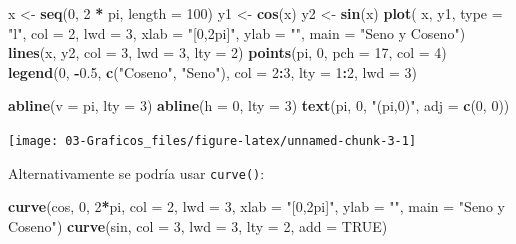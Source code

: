 \documentclass[]{book}
\newenvironment{Shaded}{\begin{snugshade}}{\end{snugshade}}
\newcommand{\KeywordTok}[1]{\textcolor[rgb]{0.13,0.29,0.53}{\textbf{#1}}}
\newcommand{\DataTypeTok}[1]{\textcolor[rgb]{0.13,0.29,0.53}{#1}}
\newcommand{\DecValTok}[1]{\textcolor[rgb]{0.00,0.00,0.81}{#1}}
\newcommand{\FloatTok}[1]{\textcolor[rgb]{0.00,0.00,0.81}{#1}}
\newcommand{\StringTok}[1]{\textcolor[rgb]{0.31,0.60,0.02}{#1}}
\newcommand{\OtherTok}[1]{\textcolor[rgb]{0.56,0.35,0.01}{#1}}
\newcommand{\OperatorTok}[1]{\textcolor[rgb]{0.81,0.36,0.00}{\textbf{#1}}}
\newcommand{\NormalTok}[1]{#1}
\begin{document}
\begin{Shaded}
\begin{Highlighting}[]
\NormalTok{x <-}\StringTok{ }\KeywordTok{seq}\NormalTok{(}\DecValTok{0}\NormalTok{, }\DecValTok{2} \OperatorTok{*}\StringTok{ }\NormalTok{pi, }\DataTypeTok{length =} \DecValTok{100}\NormalTok{)}
\NormalTok{y1 <-}\StringTok{ }\KeywordTok{cos}\NormalTok{(x)}
\NormalTok{y2 <-}\StringTok{ }\KeywordTok{sin}\NormalTok{(x)}
\KeywordTok{plot}\NormalTok{( x, y1, }\DataTypeTok{type =} \StringTok{"l"}\NormalTok{, }\DataTypeTok{col =} \DecValTok{2}\NormalTok{, }\DataTypeTok{lwd =} \DecValTok{3}\NormalTok{, }\DataTypeTok{xlab =} \StringTok{"[0,2pi]"}\NormalTok{, }\DataTypeTok{ylab =} \StringTok{""}\NormalTok{, }\DataTypeTok{main =} \StringTok{"Seno y Coseno"}\NormalTok{)}
\KeywordTok{lines}\NormalTok{(x, y2, }\DataTypeTok{col =} \DecValTok{3}\NormalTok{, }\DataTypeTok{lwd =} \DecValTok{3}\NormalTok{, }\DataTypeTok{lty =} \DecValTok{2}\NormalTok{)}
\KeywordTok{points}\NormalTok{(pi, }\DecValTok{0}\NormalTok{, }\DataTypeTok{pch =} \DecValTok{17}\NormalTok{, }\DataTypeTok{col =} \DecValTok{4}\NormalTok{)}
\KeywordTok{legend}\NormalTok{(}\DecValTok{0}\NormalTok{, }\OperatorTok{-}\FloatTok{0.5}\NormalTok{, }\KeywordTok{c}\NormalTok{(}\StringTok{"Coseno"}\NormalTok{, }\StringTok{"Seno"}\NormalTok{), }\DataTypeTok{col =} \DecValTok{2}\OperatorTok{:}\DecValTok{3}\NormalTok{, }\DataTypeTok{lty =} \DecValTok{1}\OperatorTok{:}\DecValTok{2}\NormalTok{, }\DataTypeTok{lwd =} \DecValTok{3}\NormalTok{)}

\KeywordTok{abline}\NormalTok{(}\DataTypeTok{v =}\NormalTok{ pi, }\DataTypeTok{lty =} \DecValTok{3}\NormalTok{)}
\KeywordTok{abline}\NormalTok{(}\DataTypeTok{h =} \DecValTok{0}\NormalTok{, }\DataTypeTok{lty =} \DecValTok{3}\NormalTok{)}
\KeywordTok{text}\NormalTok{(pi, }\DecValTok{0}\NormalTok{, }\StringTok{"(pi,0)"}\NormalTok{, }\DataTypeTok{adj =} \KeywordTok{c}\NormalTok{(}\DecValTok{0}\NormalTok{, }\DecValTok{0}\NormalTok{))}
\end{Highlighting}
\end{Shaded}

\begin{center}\texttt{[image: 03-Graficos\_files/figure-latex/unnamed-chunk-3-1]} \end{center}

Alternativamente se podría usar \texttt{curve()}:

\begin{Shaded}
\begin{Highlighting}[]
\KeywordTok{curve}\NormalTok{(cos, }\DecValTok{0}\NormalTok{, }\DecValTok{2}\OperatorTok{*}\NormalTok{pi, }\DataTypeTok{col =} \DecValTok{2}\NormalTok{, }\DataTypeTok{lwd =} \DecValTok{3}\NormalTok{, }
      \DataTypeTok{xlab =} \StringTok{"[0,2pi]"}\NormalTok{, }\DataTypeTok{ylab =} \StringTok{""}\NormalTok{, }\DataTypeTok{main =} \StringTok{"Seno y Coseno"}\NormalTok{)}
\KeywordTok{curve}\NormalTok{(sin, }\DataTypeTok{col =} \DecValTok{3}\NormalTok{, }\DataTypeTok{lwd =} \DecValTok{3}\NormalTok{, }\DataTypeTok{lty =} \DecValTok{2}\NormalTok{, }\DataTypeTok{add =} \OtherTok{TRUE}\NormalTok{)}
\end{Highlighting}
\end{Shaded}
\end{document}
